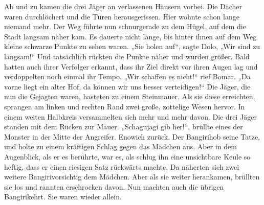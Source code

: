 \documentclass[12pt,a4paper,onecolumn,twoside,ngerman]{book}
\newcommand{\Bangiri}{Bangiri}
\newcommand{\Eno}{Eno}
\newcommand{\Bomar}{Bomar}
\newcommand{\Dolo}{Dolo}
\begin{document}
Ab und zu kamen die drei Jäger an verlassenen Häusern vorbei. Die Dächer waren durchlöchert und die Türen herausgerissen. Hier wohnte schon lange niemand mehr. Der Weg führte nun schnurgerade zu dem Hügel, auf dem die Stadt langsam näher kam. Es dauerte nicht lange, bis hinter ihnen auf dem Weg kleine schwarze Punkte zu sehen waren. „Sie holen auf“, sagte \Dolo{,} „Wir sind zu langsam!“ Und tatsächlich rückten die Punkte näher und wurden größer. Bald hatten auch ihrer Verfolger erkannt, dass ihr Ziel direkt vor ihren Augen lag und verdoppelten noch einmal ihr Tempo. „Wir schaffen es nicht!“ rief \Bomar. „Da vorne liegt ein alter Hof, da können wir uns besser verteidigen!“ Die Jäger, die nun die Gejagten waren, hasteten zu einem Steinmauer. Als sie diese erreichten, sprangen am linken und rechten Rand zwei große, zottelige Wesen hervor. In einem weiten Halbkreis versammelten sich mehr und mehr davon. Die drei Jäger standen mit dem Rücken zur Mauer. „Schagujagi gib her!“, brüllte eines der Monster in der Mitte der Angreifer. \Eno wich zurück. Der \Bangiri hob seine Tatze, und holte zu einem kräftigen Schlag gegen das Mädchen aus. Aber in dem Augenblick, als er es berührte, war es, als schlug ihn eine unsichtbare Keule so heftig, dass er einen riesigen Satz rückwärts machte. Da näherten sich zwei weitere \Bangiri vorsichtig dem Mädchen. Aber als sie weiter herankamen, brüllten sie los und rannten erschrocken davon. Nun machten auch die übrigen \Bangiri kehrt. Sie waren wieder allein.
\end{document}
